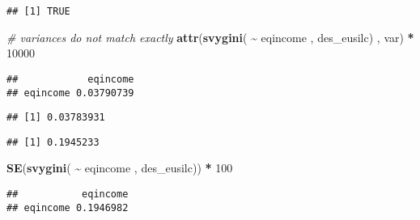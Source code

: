 \documentclass[
]{book}
\newenvironment{Shaded}{\begin{snugshade}}{\end{snugshade}}
\newcommand{\CommentTok}[1]{\textcolor[rgb]{0.56,0.35,0.01}{\textit{#1}}}
\newcommand{\DecValTok}[1]{\textcolor[rgb]{0.00,0.00,0.81}{#1}}
\newcommand{\FunctionTok}[1]{\textcolor[rgb]{0.13,0.29,0.53}{\textbf{#1}}}
\newcommand{\NormalTok}[1]{#1}
\newcommand{\SpecialCharTok}[1]{\textcolor[rgb]{0.81,0.36,0.00}{\textbf{#1}}}
\newcommand{\StringTok}[1]{\textcolor[rgb]{0.31,0.60,0.02}{#1}}
\begin{document}
\begin{verbatim}
## [1] TRUE
\end{verbatim}

\begin{Shaded}
\begin{Highlighting}[]
\CommentTok{\# variances do not match exactly}
\FunctionTok{attr}\NormalTok{(}\FunctionTok{svygini}\NormalTok{( }\SpecialCharTok{\textasciitilde{}}\NormalTok{ eqincome , des\_eusilc) , }\StringTok{\textquotesingle{}var\textquotesingle{}}\NormalTok{) }\SpecialCharTok{*} \DecValTok{10000}
\end{Highlighting}
\end{Shaded}

\begin{verbatim}
##            eqincome
## eqincome 0.03790739
\end{verbatim}

\begin{Shaded}
\end{Shaded}

\begin{verbatim}
## [1] 0.03783931
\end{verbatim}

\begin{Shaded}
\end{Shaded}

\begin{verbatim}
## [1] 0.1945233
\end{verbatim}

\begin{Shaded}
\begin{Highlighting}[]
\FunctionTok{SE}\NormalTok{(}\FunctionTok{svygini}\NormalTok{( }\SpecialCharTok{\textasciitilde{}}\NormalTok{ eqincome , des\_eusilc)) }\SpecialCharTok{*} \DecValTok{100}
\end{Highlighting}
\end{Shaded}

\begin{verbatim}
##           eqincome
## eqincome 0.1946982
\end{verbatim}
\end{document}
